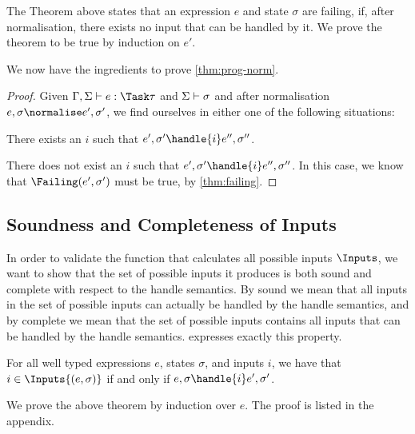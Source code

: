 The Theorem above states that an expression $e$ and state $\sigma$ are failing, if,
after normalisation, there exists no input that can be handled by it.
We prove the theorem to be true by induction on $e'$.


We now have the ingredients to prove \cref{thm:prog-norm}.

\begin{proof}
  Given $\Gamma,\Sigma\infers e:\Task\tau$ and $\Sigma\vdash \sigma$ and after
  normalisation $e,\sigma \normalise e',\sigma'$, we find ourselves in either one of the
  following situations:

  There exists an $i$ such that $e',\sigma'\handle{i} e'',\sigma''$.

  There does not exist an $i$ such that $e',\sigma'\handle{i} e'',\sigma''$. In this case, we
  know that $\Failing(e',\sigma')$ must be true, by \cref{thm:failing}.
\end{proof}



\subsection{Soundness and Completeness of Inputs}

In order to validate the function that calculates all possible inputs $\Inputs$,
we want to show that the set of possible inputs it produces is both sound and complete with respect to the handle semantics.
By sound we mean that all inputs in the set of possible inputs can actually be handled by the handle semantics,
and by complete we mean that the set of possible inputs contains all inputs that can be handled by the handle semantics.
 expresses exactly this property.

\begin{theorem}
  For all well typed expressions $e$, states $\sigma$, and inputs $i$,
  we have that $i \in \Inputs{(e,\sigma)}$ if and only if $e,\sigma \handle{i} e',\sigma'$.
  \label{thm:safety-i}
\end{theorem}

We prove the above theorem by induction over $e$. The proof is listed in the
appendix.
